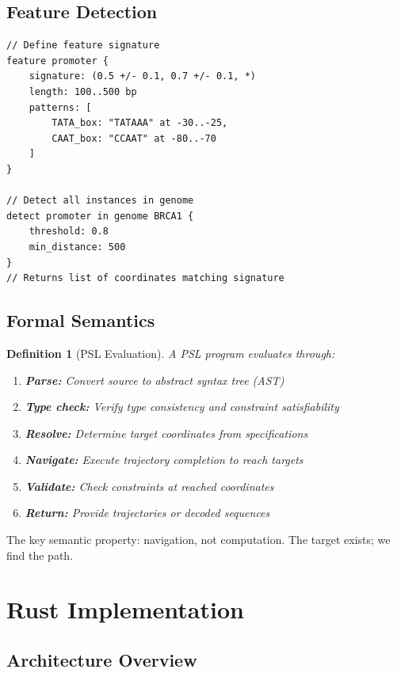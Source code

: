 \documentclass[twocolumn,10pt]{article}
\newtheorem{definition}[theorem]{Definition}
\theoremstyle{remark}
\begin{document}
\subsection{Feature Detection}

\begin{lstlisting}[style=tritcode]
// Define feature signature
feature promoter {
    signature: (0.5 +/- 0.1, 0.7 +/- 0.1, *)
    length: 100..500 bp
    patterns: [
        TATA_box: "TATAAA" at -30..-25,
        CAAT_box: "CCAAT" at -80..-70
    ]
}

// Detect all instances in genome
detect promoter in genome BRCA1 {
    threshold: 0.8
    min_distance: 500
}
// Returns list of coordinates matching signature
\end{lstlisting}

\subsection{Formal Semantics}

\begin{definition}[PSL Evaluation]
A PSL program evaluates through:
\begin{enumerate}
\item \textbf{Parse:} Convert source to abstract syntax tree (AST)
\item \textbf{Type check:} Verify type consistency and constraint satisfiability
\item \textbf{Resolve:} Determine target coordinates from specifications
\item \textbf{Navigate:} Execute trajectory completion to reach targets
\item \textbf{Validate:} Check constraints at reached coordinates
\item \textbf{Return:} Provide trajectories or decoded sequences
\end{enumerate}
\end{definition}

The key semantic property: navigation, not computation. The target exists; we find the path.

\section{Rust Implementation}

\subsection{Architecture Overview}
\end{document}

